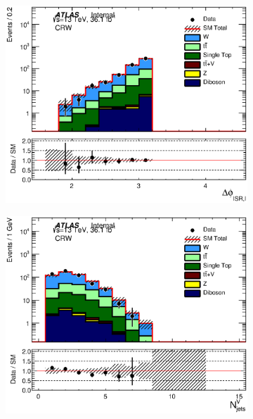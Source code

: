 \begin{figure}[h!]
\begin{center}
\begin{subfigure}[b]{0.40\textwidth}
    \end{subfigure}
    \begin{subfigure}[b]{0.40\textwidth}    
    	 \includegraphics[width=\textwidth]{figures/plotRegion/CA_dphiISRI_CRW_log.eps}
                \caption{ }
    \end{subfigure}
    \begin{subfigure}[b]{0.40\textwidth}    
    	 \includegraphics[width=\textwidth]{figures/plotRegion/CA_NjV_CRW_log.eps}
                \caption{ }
    \end{subfigure}
    \begin{subfigure}[b]{0.40\textwidth}    

\end{subfigure}
\end{center}
\end{figure}
